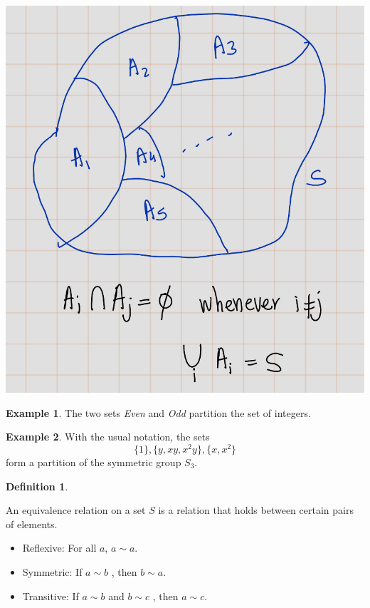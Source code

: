 \documentclass[
]{book}
\providecommand{\tightlist}{%
  \setlength{\itemsep}{0pt}\setlength{\parskip}{0pt}}
\theoremstyle{definition}
\newtheorem{definition}{Definition}[chapter]
\theoremstyle{definition}
\newtheorem{example}{Example}[chapter]
\theoremstyle{definition}
\theoremstyle{definition}
\theoremstyle{remark}
\begin{document}
\includegraphics{figures/ch_2/fig32.png}

\begin{example}
\protect\hypertarget{exm:unnamed-chunk-27}{}\label{exm:unnamed-chunk-27}The two sets \emph{Even} and \emph{Odd} partition the set of integers.
\end{example}

\begin{example}
\protect\hypertarget{exm:unnamed-chunk-28}{}\label{exm:unnamed-chunk-28}With the usual notation, the sets
\[\{1\}, \{y, xy, x^2y\}, \{x, x^2\}\]
form a partition of the symmetric group \(S_3\).
\end{example}

\begin{definition}
\protect\hypertarget{def:unnamed-chunk-29}{}\label{def:unnamed-chunk-29}

An equivalence relation on a set \(S\) is a relation that holds between certain pairs of elements.

\begin{itemize}
\tightlist
\item
  Reflexive: For all \(a\), \(a \sim a\).
\item
  Symmetric: If \(a \sim b\) , then \(b \sim a\).
\item
  Transitive: If \(a \sim b\) and \(b \sim c\) , then \(a \sim c\).
\end{itemize}

\end{definition}
\end{document}
